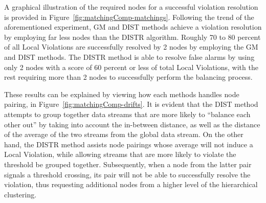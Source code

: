A graphical illustration of the required nodes for a successful violation resolution is provided in Figure~\ref{fig:matchingComp-matchings}. Following the trend of the aforementioned experiment, GM and DIST methods achieve a violation resolution by employing far less nodes than the DISTR algorithm. Roughly 70 to 80 percent of all Local Violations are successfully resolved by 2 nodes by employing the GM and DIST methods. The DISTR method is able to resolve false alarms by using only 2 nodes with a score of 60 percent or less of total Local Violations, with the rest requiring more than 2 nodes to successfully perform the balancing process.

These results can be explained by viewing how each methods handles node pairing, in Figure~\ref{fig:matchingComp-drifts}. It is evident that the DIST method attempts to group together data streams that are more likely to ``balance each other out'' by taking into account the in-between distance, as well as the distance of the average of the two streams from the global data stream. On the other hand, the DISTR method assists node pairings whose average will not induce a Local Violation, while allowing streams that are more likely to violate the threshold be grouped together. Subsequently, when a node from the latter pair signals a threshold crossing, its pair will not be able to successfully resolve the violation, thus requesting additional nodes from a higher level of the hierarchical clustering.

